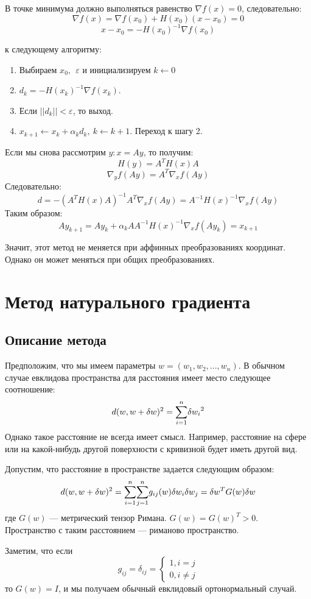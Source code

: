 \documentclass[a4paper,12pt]{article}
\begin{document}
В точке минимума должно выполняться равенство $\nabla{f(x)} = 0$, следовательно:
$$\nabla{f(x)} = \nabla{f(x_0)} + H(x_0)(x - x_0) = 0$$
$$x - x_0 = -H(x_0)^{-1}\nabla{f(x_0)}$$

 к следующему алгоритму:
\begin{enumerate}
    \item Выбираем $x_0, ~~ \varepsilon $ и инициализируем $k \leftarrow 0$
    \item $d_k = -H(x_k)^{-1}\nabla{f(x_k)}$.
    \item Если $||d_k|| < \varepsilon$, то выход.
    \item $x_{k+1} \leftarrow x_{k} + \alpha_k d_k, ~ k \leftarrow k + 1$. Переход к шагу 2. 
\end{enumerate}

Если мы снова рассмотрим $y: x = Ay$, то получим:
$$H(y) = A^TH(x)A$$
$$\nabla_y{f(Ay)} = A^T \nabla_x{f(Ay)}$$
Следовательно:
$$d = -(A^TH(x)A)^{-1} A^T \nabla_x{f(Ay)} = A^{-1}H(x)^{-1} \nabla_x{f(Ay)} $$
Таким образом: 
$$Ay_{k+1} = Ay_{k} + \alpha_k AA^{-1}H(x)^{-1} \nabla_x{f(Ay_k)} = x_{k+1}$$

Значит, этот метод не меняется при аффинных преобразованиях координат. Однако он может меняться при общих преобразованиях.
\newpage

\section{Метод натурального градиента}
\subsection{Описание метода}

Предположим, что мы имеем параметры $w = (w_1, w_2, ..., w_n)$. В обычном случае евклидова пространства для расстояния имеет место следующее соотношение:
$$d(w, w+\delta w)^2 = \sumfromto{i = 1}{n}{\delta w_i}^2$$
Однако такое расстояние не всегда имеет смысл. Hапример, расстояние на сфере или на какой-нибудь другой поверхности с кривизной будет иметь другой вид.

Допустим, что расстояние в пространстве задается следующим образом:
$$d(w, w+\delta w)^2 = \sumfromto{i = 1}{n}{\sumfromto{j = 1}{n}{g_{ij}(w) \delta w_i \delta w_j}} = \delta w^T G(w) \delta w$$
где $G(w)$ --- метрический тензор Римана. $G(w) = G(w)^T > 0$. Пространство с таким расстоянием --- риманово пространство.

Заметим, что если 
$$
    g_{ij} = \delta_{ij} = 
    \left\{ 
        \begin{aligned} 
            1, i = j \\ 
            0, i \neq j 
        \end{aligned} 
    \right.
$$
то $G(w) = I$, и мы получаем обычный евклидовый ортонормальный случай.
\end{document}
